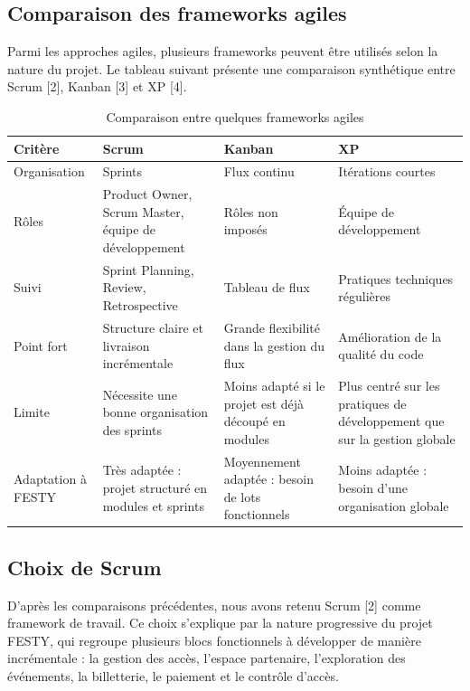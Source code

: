 \subsection{Comparaison des frameworks agiles}


Parmi les approches agiles, plusieurs frameworks peuvent être utilisés selon la nature du projet. Le tableau suivant présente une comparaison synthétique entre Scrum [2], Kanban [3] et XP [4].


\begin{table}[H]
\centering
\caption{Comparaison entre quelques frameworks agiles}
\label{tableau:1-4}
\renewcommand{\arraystretch}{1.2}
\begin{tabularx}{\textwidth}{|>{\raggedright\arraybackslash}X|>{\raggedright\arraybackslash}X|>{\raggedright\arraybackslash}X|>{\raggedright\arraybackslash}X|}
\hline
\rowcolor[HTML]{ECF4FF}
\textbf{Critère} & \textbf{Scrum} & \textbf{Kanban} & \textbf{XP} \\
\hline
Organisation & Sprints & Flux continu & Itérations courtes \\
\hline
Rôles & Product Owner, Scrum Master, équipe de développement & Rôles non imposés & Équipe de développement \\
\hline
Suivi & Sprint Planning, Review, Retrospective & Tableau de flux & Pratiques techniques régulières \\
\hline
Point fort & Structure claire et livraison incrémentale & Grande flexibilité dans la gestion du flux & Amélioration de la qualité du code \\
\hline
Limite & Nécessite une bonne organisation des sprints & Moins adapté si le projet est déjà découpé en modules & Plus centré sur les pratiques de développement que sur la gestion globale \\
\hline
Adaptation à FESTY & Très adaptée : projet structuré en modules et sprints & Moyennement adaptée : besoin de lots fonctionnels & Moins adaptée : besoin d’une organisation globale \\
\hline
\end{tabularx}
\end{table}


\subsection{Choix de Scrum}


D’après les comparaisons précédentes, nous avons retenu Scrum [2] comme framework de travail. Ce choix s’explique par la nature progressive du projet FESTY, qui regroupe plusieurs blocs fonctionnels à développer de manière incrémentale : la gestion des accès, l’espace partenaire, l’exploration des événements, la billetterie, le paiement et le contrôle d’accès.


